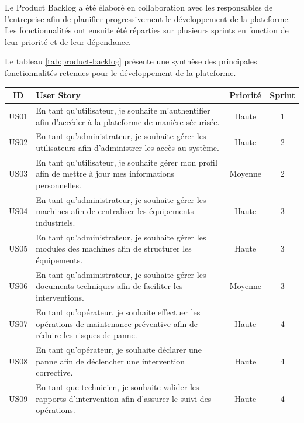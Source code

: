 Le Product Backlog a été élaboré en collaboration avec les responsables de l'entreprise afin de planifier progressivement le développement de la plateforme. Les fonctionnalités ont ensuite été réparties sur plusieurs sprints en fonction de leur priorité et de leur dépendance.

Le tableau \ref{tab:product-backlog} présente une synthèse des principales fonctionnalités retenues pour le développement de la plateforme.

\begin{table}[H]
\centering
\renewcommand{\arraystretch}{1.3}
\small
\begin{tabular}{|c|p{6cm}|c|c|}
\hline
\textbf{ID} &
\textbf{User Story} &
\textbf{Priorité} &
\textbf{Sprint}
\\
\hline

US01 &
En tant qu'utilisateur, je souhaite m'authentifier afin d'accéder à la plateforme de manière sécurisée. &
Haute &
1
\\
\hline

US02 &
En tant qu'administrateur, je souhaite gérer les utilisateurs afin d'administrer les accès au système. &
Haute &
2
\\
\hline

US03 &
En tant qu'utilisateur, je souhaite gérer mon profil afin de mettre à jour mes informations personnelles. &
Moyenne &
2
\\
\hline

US04 &
En tant qu'administrateur, je souhaite gérer les machines afin de centraliser les équipements industriels. &
Haute &
3
\\
\hline

US05 &
En tant qu'administrateur, je souhaite gérer les modules des machines afin de structurer les équipements. &
Haute &
3
\\
\hline

US06 &
En tant qu'administrateur, je souhaite gérer les documents techniques afin de faciliter les interventions. &
Moyenne &
3
\\
\hline

US07 &
En tant qu'opérateur, je souhaite effectuer les opérations de maintenance préventive afin de réduire les risques de panne. &
Haute &
4
\\
\hline

US08 &
En tant qu'opérateur, je souhaite déclarer une panne afin de déclencher une intervention corrective. &
Haute &
4
\\
\hline

US09 &
En tant que technicien, je souhaite valider les rapports d'intervention afin d'assurer le suivi des opérations. &
Haute &
4
\\
\hline


\end{tabular}
\end{table}
